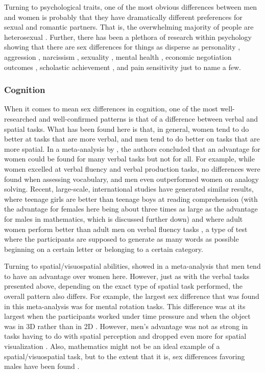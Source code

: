 Turning to psychological traits, one of the most obvious differences between men and women is probably that they have dramatically different preferences for sexual and romantic partners. That is, the overwhelming majority of people are heterosexual \parencite{Bailey2016}. Further, there has been a plethora of research within psychology showing that there are sex differences for things as disperse as personality \parencite{Costa2001}, aggression \parencite{Bettencourt1996}, narcissism \parencite{Grijalva2015}, sexuality \parencite{Petersen2010}, mental health \parencite{Rosenfield2013}, economic negotiation outcomes \parencite{Mazei2015}, scholastic achievement \parencite{Voyer2014}, and pain sensitivity \parencite{Fillingim2009} just to name a few.

\subsubsection{Cognition} \label{Mean_differences_cognition}

When it comes to mean sex differences in cognition, one of the most well-researched and well-confirmed patterns is that of a difference between verbal and spatial tasks. What has been found here is that, in general, women tend to do better at tasks that are more verbal, and men tend to do better on tasks that are more spatial. In a meta-analysis by \textcite{Hyde1988}, the authors concluded that an advantage for women could be found for many verbal tasks but not for all. For example, while women excelled at verbal fluency and verbal production tasks, no differences were found when assessing vocabulary, and men even outperformed women on analogy solving. Recent, large-scale, international studies have generated similar results, where teenage girls are better than teenage boys at reading comprehension \parencite{Stoet2013} (with the advantage for females here being about three times as large as the advantage for males in mathematics, which is discussed further down) and where adult women perform better than adult men on verbal fluency tasks \parencite{Maylor2007}, a type of test where the participants are supposed to generate as many words as possible beginning on a certain letter or belonging to a certain category.

Turning to spatial/visuospatial abilities, \textcite{Voyer1995} showed in a meta-analysis that men tend to have an advantage over women here. However, just as with the verbal tasks presented above, depending on the exact type of spatial task performed, the overall pattern also differs. For example, the largest sex difference that was found in this meta-analysis was for mental rotation tasks. This difference was at its largest when the participants worked under time pressure and when the object was in 3D rather than in 2D \parencite{Voyer1995,Voyer2011}. However, men's advantage was not as strong in tasks having to do with spatial perception and dropped even more for spatial visualization \parencite{Voyer1995}. Also, mathematics might not be an ideal example of a spatial/visuospatial task, but to the extent that it is, sex differences favoring males have been found \parencite{Stoet2013}.

